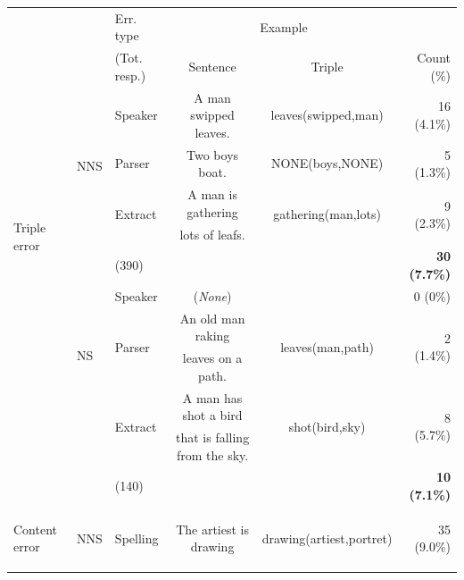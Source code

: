 \begin{table}[htb!]
\begin{center}
\setlength{\tabcolsep}{.3em}
\begin{tabular}{|l|l|l|cc|r|}
  \hline
  & & Err. type & \multicolumn{2}{c|}{Example} &  \\
  & & (Tot. resp.) & Sentence & Triple & Count (\%)\\
  \hline
  \hline
  \multirow{8}{*}{\begin{sideways}Triple error\end{sideways}} &
  \multirow{4}{*}{\begin{sideways}NNS\end{sideways}} & Speaker & A man swipped leaves. & leaves(swipped,man) & 16 (4.1\%) \\

  \cline{3-6}
  & & Parser & Two boys boat. & NONE(boys,NONE) & 5 (1.3\%) \\
  \cline{3-6}
  & & \multirow{2}{*}{Extract} & A man is gathering & \multirow{2}{*}{gathering(man,lots)} & \multirow{2}{*}{9 (2.3\%)} \\
  & & & lots of leafs. & & \\
  \cline{3-6}
  & & (390) & & & \textbf{30 (7.7\%)} \\
 \cline{2-6}
 & \multirow{4}{*}{\begin{sideways}NS\end{sideways}} & Speaker & (\textit{None}) & & 0 (0\%) \\
 \cline{3-6}
 & & \multirow{2}{*}{Parser} & An old man raking & \multirow{2}{*}{leaves(man,path)} & \multirow{2}{*}{2 (1.4\%)} \\
  & & & leaves on a path. & & \\
 \cline{3-6}
 & & \multirow{2}{*}{Extract} & A man has shot a bird & \multirow{2}{*}{shot(bird,sky)} & \multirow{2}{*}{8 (5.7\%)} \\
 & & & that is falling from the sky. & & \\
 \cline{3-6}
 & & (140) & & & \textbf{10 (7.1\%)} \\
 \hline
 \hline
 \multirow{6}{*}{\begin{sideways}Content error\end{sideways}} & \multirow{3}{*}{\begin{sideways}NNS\end{sideways}} & \multirow{2}{*}{Spelling} & The artiest is drawing & \multirow{2}{*}{drawing(artiest,portret)} & \multirow{2}{*}{35 (9.0\%)} \\

\end{tabular}
\end{center}
\end{table}
